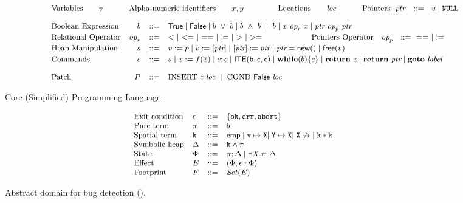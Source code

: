 \begin{figure*}[t]
\[
\;\;\;\;\;\;\;\;\;\;\;
{\small
\begin{array}{l r c l}
 \\[2pt]
 \text{Variables} \qquad v & \multicolumn{3}{l}{
  \text{Alpha-numeric identifiers} \qquad {x, y    }
   \qquad\qquad\
  \text{Locations} \qquad {\textit{loc}    }
  \qquad\quad~
   \text{Pointers} ~~ ptr ~~ ::= ~~ v \mid \nullc}
 \\[10pt]
 \text{Boolean Expression} & b & ::= &
 \True \mid  \False \mid  b ~\vee~ b \mid   b ~\wedge~ b \mid  \neg b \mid x ~\textit{op}_r~ x \mid  \textit{ptr} ~ \textit{op}_p  ~ \textit{ptr}
 \\[2pt]
 \text{Relational Operator} & \textit{op}_r & ::= &  <  ~\mid~ <= ~\mid~ == ~\mid~  !\!\!= ~\mid~ > ~\mid~ >= 
  \qquad\qquad\qquad
   \text{Pointers Operator} ~~~ \textit{op}_p ~~ ::=~~ ==  ~\mid~ !\!\!=
 \\[2pt]
 \text{Heap Manipulation} & s & ::= & v \asgn p \mid  v \asgn [ \textit{ptr} ] \mid  [ \textit{ptr} ] \asgn  \textit{ptr}  \mid   \textit{ptr}  = \malloc{} \mid  \free{v} 
 \\[2pt]
 \text{Commands} &
 c & ::= &
            s 
            \mid x :=  f(\many{x})
            \mid c; c 
            \mid \ite{b}{c}{c}
            \mid \whilez(b) \{c\}
\mid \retz~  \textit{x}  \mid \retz~  \textit{ptr} \mid \gotoz ~ \textit{label}
 \\[10pt]     
 \text{Patch} &
  P & ::= & \text{INSERT} ~c~\textit{loc} ~\mid~   \text{COND} ~\False~\textit{loc}   
\end{array}
}
\]
\vspace{-0.5em}
\caption{Core (Simplified) Programming Language.}
\label{fig:lang}
\end{figure*}



\begin{figure}[t]
\vspace{-0.8em}
 \centering
%
\[
\!\!\!\!\!\!\!\!\!\!\!\!
{  \small
\begin{array}{l l c l}
 \text{Exit condition} & \epsilon  & ::=& \{\ok,\err, abort\} \\
 \text{Pure term} & \pi  & ::= & b
 \\
 \text{Spatial term} &\mcode{k} & ::= &
 \mcode{\emp \mid \pointsto{v}{X}}
 \mcode{\mid \pointsto{Y}{X}}
 \mcode{\mid \dealloc{X}}
  \mid  \mcode{  k \sep k}
 \\
 \text{Symbolic heap} & \Delta & ::= & \mcode{ k \wedge \pi}
 \\
 \text{State} & \Phi& ::= & \pi; \Delta \mid \exists X.\pi;\Delta
 \\
 \text{Effect} & E & ::= & (\Phi, \epsilon: \Phi)  
 \\
 \text{Footprint} & F & ::= &  \mathit{Set}(E)  
\end{array}
}
\]
%
\vspace{-0.5em}
\caption{Abstract domain for bug detection (\domaindetect).}
\vspace{-1em}
\label{fig:logic}
\end{figure}


